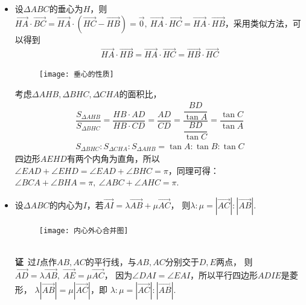 \begin{itemize}[leftmargin=\inteval{\myitemleftmargin}pt,itemsep=
   \inteval{\myitemitempsep}pt,topsep=\inteval{\myitemtopsep}pt]
\item 设$ \Delta ABC $的垂心为$ H $，则$ \vec{HA}\cdot \vec{BC}=
\vec{HA}\cdot (\vec{HC}-\vec{HB})=
\vec{0},\ \vec{HA}\cdot \vec{HC}=
\vec{HA}\cdot \vec{HB} $，采用类似方法，可以得到
\begin{align}\label{垂心性质三个连等式}
    \vec{HA}\cdot \vec{HB}=
    \vec{HA}\cdot \vec{HC}=\vec{HB}\cdot \vec{HC} 
\end{align}
\begin{figure}[h]
    \centering
    \texttt{[image: 垂心的性质]}
\end{figure}
考虑$ \Delta AHB,\Delta BHC,\Delta CHA $的面积比，
\begin{gather*}
    \dfrac{S_{\Delta AHB}}{S_{\Delta BHC}}=\dfrac{HB\cdot AD}
    {HB \cdot CD}=\dfrac{AD}{CD}=\dfrac{\dfrac{BD}{\tan A}}
    {\dfrac{BD}{\tan C}}=\dfrac{\tan C}{\tan A} \\
    S_{\Delta BHC}:S_{\Delta CHA}:S_{\Delta AHB}= \tan A:\tan B:\tan C
\end{gather*}
四边形$ AEHD $有两个内角为直角，所以$ \angle EAD+\angle EHD=\angle EAD
+\angle BHC =\pi $，同理可得：
$ \angle BCA+\angle BHA =\pi,\ \angle ABC+\angle AHC =\pi $. 

\item 设$ \Delta ABC $的内心为$ I $，若$ \vec{AI}=\lambda\vec{AB}+\mu\vec{AC} $，
则$ \lambda:\mu=|\vec{AC}|:|\vec{AB}| $. 
\begin{figure}[h]
    \centering
    \texttt{[image: 内心外心合并图]}
\end{figure}
\\
\textbf{证}\ 过$ I $点作$ AB,AC $的平行线，与$ AB,AC $分别交于$ D,E $两点，
则$ \vec{AD}=\lambda\vec{AB},\ 
\vec{AE}=\mu\vec{AC} $，
因为$ \angle DAI=\angle EAI $，所以平行四边形$ ADIE $是菱形，
$ \lambda|\vec{AB}|=\mu|\vec{AC}| $，即
$ \lambda:\mu=|\vec{AC}|:|\vec{AB}| $. 


\end{itemize}
